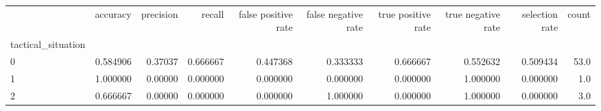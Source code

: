 \begin{tabular}{lrrrrrrrrr}
\toprule
{} &  accuracy &  precision &    recall &  false positive rate &  false negative rate &  true positive rate &  true negative rate &  selection rate &  count \\
tactical\_situation &           &            &           &                      &                      &                     &                     &                 &        \\
\midrule
0                  &  0.584906 &    0.37037 &  0.666667 &             0.447368 &             0.333333 &            0.666667 &            0.552632 &        0.509434 &   53.0 \\
1                  &  1.000000 &    0.00000 &  0.000000 &             0.000000 &             0.000000 &            0.000000 &            1.000000 &        0.000000 &    1.0 \\
2                  &  0.666667 &    0.00000 &  0.000000 &             0.000000 &             1.000000 &            0.000000 &            1.000000 &        0.000000 &    3.0 \\
\bottomrule
\end{tabular}
